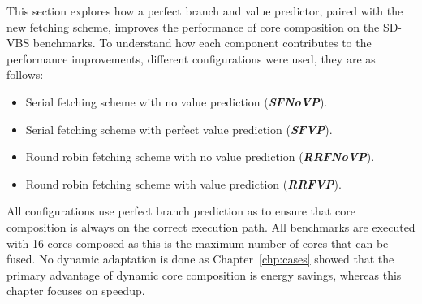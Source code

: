 \newcommand{\novp}{\textit{\textbf{SFNoVP}}}
\newcommand{\vp}{\textit{\textbf{SFVP}}}
\newcommand{\nfnovp}{\textit{\textbf{RRFNoVP}}}
\newcommand{\nfvp}{\textit{\textbf{RRFVP}}}

\newcommand{\optvp}{\textit{\textbf{OptVP}}}
\newcommand{\vt}{\textit{\textbf{VT}}}
\newcommand{\nfvt}{\textit{\textbf{RFVT}}}
\vspace{-1em}


This section explores how a perfect branch and value predictor, paired with the new fetching scheme, improves the performance of core composition on the SD-VBS benchmarks.
To understand how each component contributes to the performance improvements, different configurations were used, they are as follows:
\begin{itemize}
\item Serial fetching scheme with no value prediction (\novp).
\vspace{-1em}
\item Serial fetching scheme with perfect value prediction (\vp).
\vspace{-1em}
\item Round robin fetching scheme with no value prediction (\nfnovp).
\vspace{-1em}
\item Round robin fetching scheme with value prediction (\nfvp).
\end{itemize}

All configurations use perfect branch prediction as to ensure that core composition is always on the correct execution path.
All benchmarks are executed with 16 cores composed as this is the maximum number of cores that can be fused.
No dynamic adaptation is done as Chapter~\ref{chp:cases} showed that the primary advantage of dynamic core composition is energy savings, whereas this chapter focuses on speedup.


